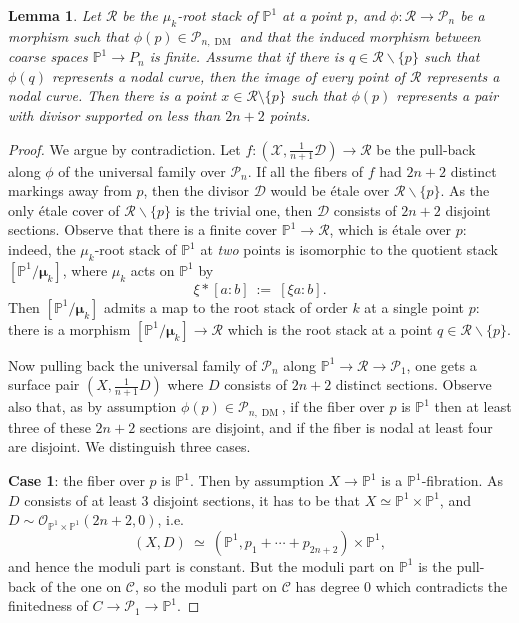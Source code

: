 \documentclass[a4paper,12pt]{amsart}
\newcommand{\mtc}[1]{\mathcal{#1}}
\newcommand{\bP}{{\mathbb P}}
\newcommand{\sP}{{\mathscr{P}}}
\newcommand{\sD}{{\mathscr{D}}}
\newcommand{\sX}{{\mathscr{X}}}
\newcommand{\sC}{{\mathscr{C}}}
\newcommand{\cR}{{\mathcal{R}}}
\newcommand{\bmu}{\bm{\mu}}
\newtheorem{lemma}[theorem]{Lemma}
\newcommand{\dm}{{\operatorname{DM}}}
\theoremstyle{definition}
\theoremstyle{remark}
\begin{document}
\begin{lemma}\label{lemma_on_tails_i_have_a_marking}
Let $\cR$ be the $\mu_k$-root stack of $\bP^1$ at a point $p$, and $\phi\colon \cR\to \sP_n$ be a morphism such that $\phi(p)\in \sP_{n,\dm}$ and that the induced morphism between coarse spaces $\bP^1\to P_n$ is finite. Assume that if there is $q\in \cR\smallsetminus\{p\}$ such that $\phi(q)$ represents a nodal curve, then the image of every point of $\cR$ represents a nodal curve. Then there is a point $x\in \cR\setminus\{p\}$ such that $\phi(p)$ represents a pair with divisor supported on less than $2n+2$ points.
\end{lemma}
\begin{proof}
    We argue by contradiction. Let $f\colon (\sX,\frac{1}{n+1}\sD)\rightarrow \cR$ be the pull-back along $\phi$ of the universal family over $\sP_n$. If all the fibers of $f$ had $2n+2$ distinct markings away from $p$, then the divisor $\sD$ would be \'etale over $\cR\smallsetminus\{p\}$. As the only \'etale cover of $\cR\smallsetminus\{p\}$ is the trivial one, then $\sD$ consists of $2n+2$ disjoint sections. Observe that there is a finite cover $\bP^1\to \cR$, which is \'etale over $p$: indeed, the $\mu_k$-root stack of $\bP^1$ at \textit{two} points is isomorphic to the quotient stack $[\bP^1/\bmu_k]$, where $\mu_k$ acts on $\bP^1$ by $$\xi*[a:b] \ :=\  [\xi a:b].$$ 
     Then $[\bP^1/\bmu_k]$ admits a map to the root stack of order $k$ at a single point $p$: there is a morphism $[\bP^1/\bmu_k]\to \cR$ which is the root stack at a point $q\in \cR\smallsetminus \{p\}$.
    
    
    Now pulling back the universal family of $\sP_n$ along $\bP^1\rightarrow \cR\rightarrow \sP_1$, one gets a surface pair $(X,\frac{1}{n+1}D)$ where $D$ consists of $2n+2$ distinct sections. Observe also that, as by assumption $\phi(p)\in\sP_{n,\dm}$, if the fiber over $p$ is $\bP^1$ then at least three of these $2n+2$ sections are disjoint, and if the fiber is nodal at least four are disjoint. We distinguish three cases.
    
    \textbf{Case 1}: the fiber over $p$ is $\bP^1$. Then by assumption $X\rightarrow \bP^1$ is a $\bP^1$-fibration. As $D$ consists of at least 3 disjoint sections, it has to be that $X\simeq\bP^1\times\bP^1$, and $D\sim \mtc{O}_{\bP^1\times\bP^1}(2n+2,0)$, i.e. $$(X,D)\ \simeq\  (\bP^1,p_1+\cdots+p_{2n+2})\times\bP^1,$$ and hence the moduli part is constant. But the moduli part on $\bP^1$ is the pull-back of the one on $\sC$, so the moduli part on $\sC$ has degree 0 which contradicts the finitedness of $C\to \sP_1\to \bP^1$.
    

\end{proof}
\end{document}
